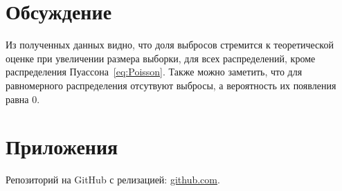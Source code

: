 \documentclass[12pt,a4paper]{scrartcl}
\begin{document}
\section{Обсуждение}
Из полученных данных видно, что доля выбросов стремится к теоретической оценке при увеличении размера выборки, для всех распределений, кроме распределения Пуассона~\eqref{eq:Poisson}. Также можно заметить, что для равномерного распределения отсутвуют выбросы, а вероятность их появления равна 0.

\section{Приложения}
Репозиторий на GitHub с релизацией: \href{https://github.com/WiillyWonka/MatStat}{github.com}.
\end{document}
